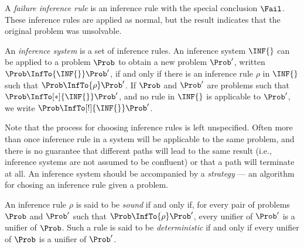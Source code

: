 A \emph{failure inference rule} is an inference rule with the special
conclusion $\Fail$. These inference rules are applied as normal, but the result
indicates that the original problem was unsolvable.

An \emph{inference system} is a set of inference rules. An inference system
$\INF{}$ can be applied to a problem $\Prob$ to obtain a new problem $\Prob'$,
written $\Prob \InfTo{\INF{}} \Prob'$, if and only if there is an inference rule
$\rho$ in $\INF{}$ such that $\Prob \InfTo{\rho} \Prob'$. If $\Prob$ and
$\Prob'$ are problems such that $\Prob \InfTo[*]{\INF{}} \Prob'$, and no rule
in $\INF{}$ is applicable to $\Prob'$, we write $\Prob \InfTo[!]{\INF{}}
\Prob'$.

Note that the process for choosing inference rules is left unspecified. Often
more than once inference rule in a system will be applicable to the same
problem, and there is no guarantee that different paths will lead to the same
result (i.e., inference systems are not assumed to be confluent) or that a path
will terminate at all. An inference system should be accompanied by a
\emph{strategy} --- an algorithm for chosing an inference rule given a problem.

An inference rule $\rho$ is said to be \emph{sound} if and only if, for every
pair of problems $\Prob$ and $\Prob'$ such that $\Prob \InfTo{\rho} \Prob'$,
every unifier of $\Prob'$ is a unifier of $\Prob$. Such a rule is said to be
\emph{deterministic} if and only if every unifier of $\Prob$ is a unifier of
$\Prob'$.

